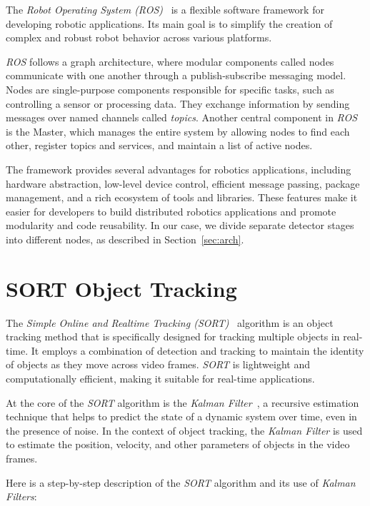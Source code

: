 The \textit{Robot Operating System (ROS)}~\cite{quigley2009ros} is a flexible software framework for developing robotic applications.
Its main goal is to simplify the creation of complex and robust robot behavior across various platforms.

\textit{ROS} follows a graph architecture, where modular components called nodes communicate with one another through a publish-subscribe messaging model.
Nodes are single-purpose components responsible for specific tasks, such as controlling a sensor or processing data.
They exchange information by sending messages over named channels called \textit{topics}.
Another central component in \textit{ROS} is the Master, which manages the entire system by allowing nodes to find each other, register topics and services, and maintain a list of active nodes.

The framework provides several advantages for robotics applications, including hardware abstraction, low-level device control, efficient message passing, package management, and a rich ecosystem of tools and libraries.
These features make it easier for developers to build distributed robotics applications and promote modularity and code reusability.
In our case, we divide separate detector stages into different nodes, as described in Section~\ref{sec:arch}.

\section{SORT Object Tracking}
\label{sec:sort}

The \textit{Simple Online and Realtime Tracking (SORT)}~\cite{bewley2016simple} algorithm is an object tracking method that is specifically designed for tracking multiple objects in real-time.
It employs a combination of detection and tracking to maintain the identity of objects as they move across video frames.
\textit{SORT} is lightweight and computationally efficient, making it suitable for real-time applications.

At the core of the \textit{SORT} algorithm is the \textit{Kalman Filter}~\cite{welch1995kalman}, a recursive estimation technique that helps to predict the state of a dynamic system over time, even in the presence of noise.
In the context of object tracking, the \textit{Kalman Filter} is used to estimate the position, velocity, and other parameters of objects in the video frames.

Here is a step-by-step description of the \textit{SORT} algorithm and its use of \textit{Kalman Filters}:

